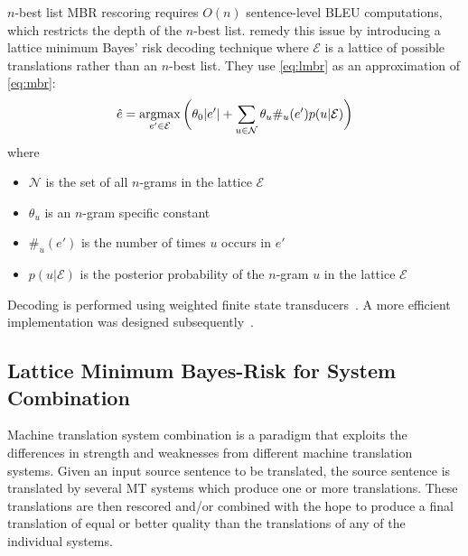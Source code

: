 $n$-best list MBR rescoring requires $O(n)$ sentence-level
BLEU computations, which restricts the depth of the $n$-best list.
\citet{tromble-kumar-och-macherey:2008:EMNLP} remedy this issue
by introducing a
lattice minimum Bayes' risk decoding technique where $\mathcal{E}$ is a lattice
of possible translations rather than an $n$-best list.
They use \autoref{eq:lmbr} as an approximation
of \autoref{eq:mbr}:
%
\begin{equation} \label{eq:lmbr}
  \hat{e} = \operatorname*{argmax}_{e' \in \mathcal{E}} \bigg ( \theta_0 |e'| + \sum_{u \in \mathcal{N}} \theta_u \#_u(e') p(u|\mathcal{E}) \bigg )
\end{equation}
%
where
%
\begin{itemize}
  \item $\mathcal{N}$ is the set of all $n$-grams in the lattice $\mathcal{E}$
  \item $\theta_u$ is an $n$-gram specific constant
  \item $\#_u(e')$ is the number of times $u$ occurs in $e'$
  \item $p(u|\mathcal{E})$ is the posterior probability of the $n$-gram $u$ in the lattice $\mathcal{E}$
\end{itemize}
%
Decoding is performed using weighted finite state
transducers~\citep{tromble-kumar-och-macherey:2008:EMNLP}. A more efficient
implementation was designed
subsequently~\citep{blackwood-degispert-byrne:2010:ACL,blackwood:2010:PHD}.


\subsection{Lattice Minimum Bayes-Risk for System Combination}

Machine translation system combination is a paradigm that exploits
the differences in strength and weaknesses from different
machine translation systems. Given an input source sentence to be
translated, the source sentence is translated by several MT systems
which produce one or more translations. These translations
are then rescored and/or combined with the hope to produce
a final translation of equal or better quality than the translations
of any of the individual systems.

